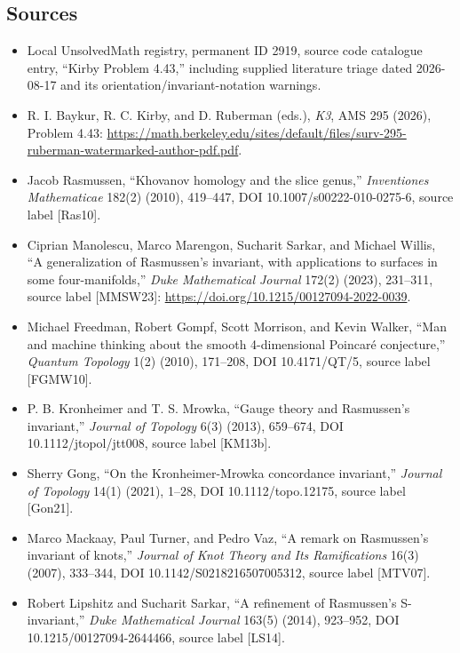 \documentclass[11pt]{article}
\begin{document}
\subsection{Sources}
\begin{itemize}
\item Local UnsolvedMath registry, permanent ID 2919, source code catalogue entry, ``Kirby Problem 4.43,'' including supplied literature triage dated 2026-08-17 and its orientation/invariant-notation warnings.
\item R. I. Baykur, R. C. Kirby, and D. Ruberman (eds.), \emph{K3}, AMS 295 (2026), Problem 4.43: \url{https://math.berkeley.edu/sites/default/files/surv-295-ruberman-watermarked-author-pdf.pdf}.
\item Jacob Rasmussen, ``Khovanov homology and the slice genus,'' \emph{Inventiones Mathematicae} 182(2) (2010), 419--447, DOI 10.1007/s00222-010-0275-6, source label [Ras10].
\item Ciprian Manolescu, Marco Marengon, Sucharit Sarkar, and Michael Willis, ``A generalization of Rasmussen's invariant, with applications to surfaces in some four-manifolds,'' \emph{Duke Mathematical Journal} 172(2) (2023), 231--311, source label [MMSW23]: \url{https://doi.org/10.1215/00127094-2022-0039}.
\item Michael Freedman, Robert Gompf, Scott Morrison, and Kevin Walker, ``Man and machine thinking about the smooth 4-dimensional Poincar\'e conjecture,'' \emph{Quantum Topology} 1(2) (2010), 171--208, DOI 10.4171/QT/5, source label [FGMW10].
\item P. B. Kronheimer and T. S. Mrowka, ``Gauge theory and Rasmussen's invariant,'' \emph{Journal of Topology} 6(3) (2013), 659--674, DOI 10.1112/jtopol/jtt008, source label [KM13b].
\item Sherry Gong, ``On the Kronheimer-Mrowka concordance invariant,'' \emph{Journal of Topology} 14(1) (2021), 1--28, DOI 10.1112/topo.12175, source label [Gon21].
\item Marco Mackaay, Paul Turner, and Pedro Vaz, ``A remark on Rasmussen's invariant of knots,'' \emph{Journal of Knot Theory and Its Ramifications} 16(3) (2007), 333--344, DOI 10.1142/S0218216507005312, source label [MTV07].
\item Robert Lipshitz and Sucharit Sarkar, ``A refinement of Rasmussen's S-invariant,'' \emph{Duke Mathematical Journal} 163(5) (2014), 923--952, DOI 10.1215/00127094-2644466, source label [LS14].
\end{itemize}
\end{document}

